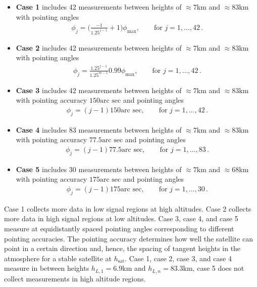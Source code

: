 \begin{itemize}
	\item \textbf{Case 1} includes 42 measurements between heights of $\approx7$km and $\approx83$km with pointing angles
	\begin{align*} 
		\phi_j  = \Bigg(\frac{-1}{1.25^{j-1}} + 1 \Bigg) \phi_{\text{max}} , \qquad  \text{for } j = 1, \dots, 42  \, .
	\end{align*}
	\item \textbf{Case 2} includes 42 measurements between heights of $\approx7$km and $\approx83$km with pointing angles
	\begin{align*} 
		\phi_j  = \frac{1.25 ^{j-1}}{ 1.25 ^{m-1}} 0.99 \phi_{\text{max}},  \qquad  \text{for } j = 1, \dots, 42\, .
	\end{align*}
	\item \textbf{Case 3} includes 42 measurements between heights of $\approx 7$km and $\approx 83$km with pointing accuracy $150 \text{arc sec}$ and pointing angles
	\begin{align*} 
		\phi_j  = (j-1) 150 \text{arc sec} ,  \qquad  \text{for } j = 1, \dots, 42\, .
	\end{align*}
	\item \textbf{Case 4} includes 83 measurements between heights of $\approx 7$km and $\approx83$km with pointing accuracy $77.5 \text{arc sec}$  and pointing angles
	\begin{align*} 
		\phi_j  =   (j-1) 77.5 \text{arc sec} ,  \qquad  \text{for } j = 1, \dots, 83\, .
	\end{align*}
	\item \textbf{Case 5} includes 30 measurements between heights of $\approx 7$km and $\approx 68$km with pointing accuracy $175  \text{arc sec}$ and pointing angles
	\begin{align*} 
		\phi_j  =  (j-1) 175 \text{arc sec} ,  \qquad  \text{for } j = 1, \dots, 30\, .
	\end{align*}
\end{itemize} 
Case 1 collects more data in low signal regions at high altitudes.
Case 2 collects more data in high signal regions at low altitudes.
Case 3, case 4, and case 5 measure at equidistantly spaced pointing angles corresponding to different pointing accuracies.
The pointing accuracy determines how well the satellite can point in a certain direction and, hence, the spacing of tangent heights in the atmosphere for a stable satellite at $h_{\text{sat}}$.
Case 1, case 2, case 3, and case 4 measure in between heights $h_{L,1} = 6.9$km and $h_{L,n} = 83.3$km, case 5 does not collect measurements in high altitude regions.
